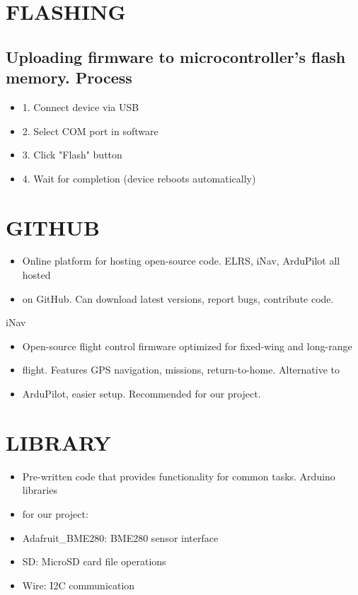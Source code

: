 \documentclass[11pt,letterpaper]{article}
\begin{document}
\section{FLASHING}

\subsection{Uploading firmware to microcontroller's flash memory. Process}

\begin{itemize}
  \item 1. Connect device via USB
  \item 2. Select COM port in software
  \item 3. Click "Flash" button
  \item 4. Wait for completion (device reboots automatically)
\end{itemize}

\section{GITHUB}

\begin{itemize}
  \item Online platform for hosting open-source code. ELRS, iNav, ArduPilot all hosted
  \item on GitHub. Can download latest versions, report bugs, contribute code.
\end{itemize}

iNav\par

\begin{itemize}
  \item Open-source flight control firmware optimized for fixed-wing and long-range
  \item flight. Features GPS navigation, missions, return-to-home. Alternative to
  \item ArduPilot, easier setup. Recommended for our project.
\end{itemize}

\section{LIBRARY}

\begin{itemize}
  \item Pre-written code that provides functionality for common tasks. Arduino libraries
  \item for our project:
  \item Adafruit\_BME280: BME280 sensor interface
  \item SD: MicroSD card file operations
  \item Wire: I2C communication
\end{itemize}
\end{document}
